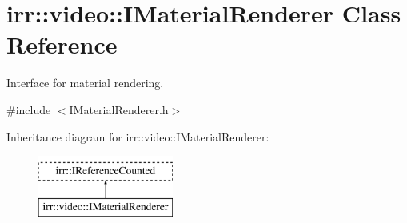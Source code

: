 \hypertarget{classirr_1_1video_1_1IMaterialRenderer}{}\section{irr\+:\+:video\+:\+:I\+Material\+Renderer Class Reference}
\label{classirr_1_1video_1_1IMaterialRenderer}


Interface for material rendering.  




{\ttfamily \#include $<$I\+Material\+Renderer.\+h$>$}

Inheritance diagram for irr\+:\+:video\+:\+:I\+Material\+Renderer\+:\begin{figure}[H]
\begin{center}
\leavevmode
\includegraphics[height=2.000000cm]{classirr_1_1video_1_1IMaterialRenderer}
\end{center}
\end{figure}
